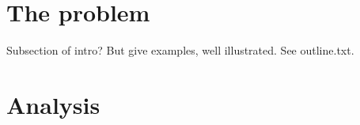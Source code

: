 \documentclass[english,submission]{programming}
\begin{document}
%
\section{The problem}
\label{sec:problem}

Subsection of intro? But give examples, well illustrated. See outline.txt.



\section{Analysis}
\label{sec:analysis}
\end{document}
